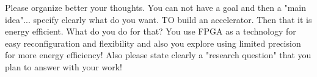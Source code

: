 Please organize better your thoughts. You can not have a goal and then a "main idea"... specify clearly what do you want. TO build an accelerator. Then that it is energy efficient. What do you do for that? You use FPGA as a technology for easy reconfiguration and flexibility and also you explore using limited precision for more energy efficiency!
Also please state clearly a "research question" that you plan to answer with your work!